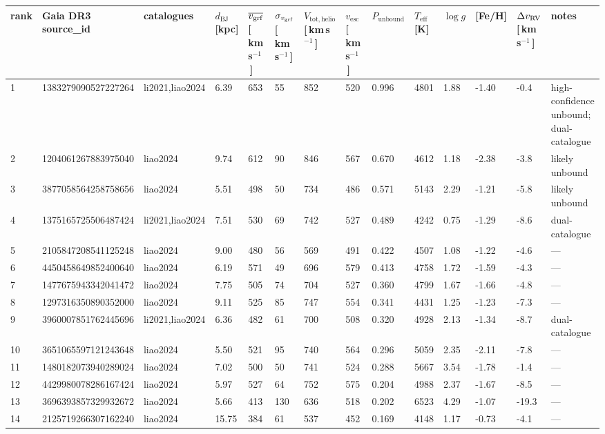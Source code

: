 \begin{tabular}{llllllllllllll}
\toprule
rank & Gaia DR3 source\_id & catalogues & $d_\mathrm{BJ}$ [kpc] & $\overline{v_{\rm grf}}$ [\,km\,s$^{-1}$\,] & $\sigma_{v_{\rm grf}}$ [\,km\,s$^{-1}$\,] & $V_\mathrm{tot,helio}$ [\,km\,s$^{-1}$\,] & $v_\mathrm{esc}$ [\,km\,s$^{-1}$\,] & $P_\mathrm{unbound}$ & $T_\mathrm{eff}$ [K] & $\log g$ & [Fe/H] & $\Delta v_{\rm RV}$ [\,km\,s$^{-1}$\,] & notes \\
\midrule
1 & 1383279090527227264 & li2021,liao2024 & 6.39 & 653 & 55 & 852 & 520 & 0.996 & 4801 & 1.88 & -1.40 & -0.4 & high-confidence unbound; dual-catalogue \\
2 & 1204061267883975040 & liao2024 & 9.74 & 612 & 90 & 846 & 567 & 0.670 & 4612 & 1.18 & -2.38 & -3.8 & likely unbound \\
3 & 3877058564258758656 & liao2024 & 5.51 & 498 & 50 & 734 & 486 & 0.571 & 5143 & 2.29 & -1.21 & -5.8 & likely unbound \\
4 & 1375165725506487424 & li2021,liao2024 & 7.51 & 530 & 69 & 742 & 527 & 0.489 & 4242 & 0.75 & -1.29 & -8.6 & dual-catalogue \\
5 & 2105847208541125248 & liao2024 & 9.00 & 480 & 56 & 569 & 491 & 0.422 & 4507 & 1.08 & -1.22 & -4.6 & --- \\
6 & 4450458649852400640 & liao2024 & 6.19 & 571 & 49 & 696 & 579 & 0.413 & 4758 & 1.72 & -1.59 & -4.3 & --- \\
7 & 1477675943342041472 & liao2024 & 7.75 & 505 & 74 & 704 & 527 & 0.360 & 4799 & 1.67 & -1.66 & -4.8 & --- \\
8 & 1297316350890352000 & liao2024 & 9.11 & 525 & 85 & 747 & 554 & 0.341 & 4431 & 1.25 & -1.23 & -7.3 & --- \\
9 & 3960007851762445696 & li2021,liao2024 & 6.36 & 482 & 61 & 700 & 508 & 0.320 & 4928 & 2.13 & -1.34 & -8.7 & dual-catalogue \\
10 & 3651065597121243648 & liao2024 & 5.50 & 521 & 95 & 740 & 564 & 0.296 & 5059 & 2.35 & -2.11 & -7.8 & --- \\
11 & 1480182073940289024 & liao2024 & 7.02 & 500 & 50 & 741 & 524 & 0.288 & 5667 & 3.54 & -1.78 & -1.4 & --- \\
12 & 4429980078286167424 & liao2024 & 5.97 & 527 & 64 & 752 & 575 & 0.204 & 4988 & 2.37 & -1.67 & -8.5 & --- \\
13 & 3696393857329932672 & liao2024 & 5.66 & 413 & 130 & 636 & 518 & 0.202 & 6523 & 4.29 & -1.07 & -19.3 & --- \\
14 & 2125719266307162240 & liao2024 & 15.75 & 384 & 61 & 537 & 452 & 0.169 & 4148 & 1.17 & -0.73 & -4.1 & --- \\

\end{tabular}
